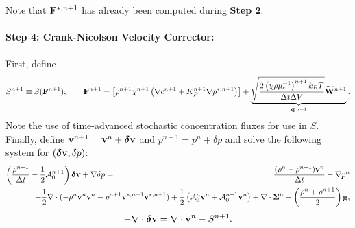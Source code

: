 \documentclass[final]{siamltex}
\def\Fb {{\bf F}}
\def\gb {{\bf g}}
\def\vb {{\bf v}}
\def\Wb {{\bf W}}
\def\deltab {\boldsymbol{\delta}}
\def\Psib   {\boldsymbol{\Psi}}
\def\Sigmab {\boldsymbol{\Sigma}}
\def\half   {\frac{1}{2}}
\begin{document}
Note that $\Fb^{*,n+1}$ has already been computed during {\bf Step 2}.\\ \\
{\bf Step 4: Crank-Nicolson Velocity Corrector:}\\ \\
First, define
\begin{equation}
S^{n+1} \equiv S(\Fb^{n+1});
\qquad
\Fb^{n+1} = \left[\rho^{n+1}\chi^{n+1}\left(\nabla c^{n+1} + K_P^{n+1}\nabla p^{*,n+1}\right)\right] + \underbrace{\sqrt{\frac{2\left(\chi\rho\mu_c^{-1}\right)^{n+1}k_B T}{\Delta t\Delta V}}\widetilde\Wb^{n+1}}_{\Psib^{n+1}}.
\end{equation}
Note the use of time-advanced stochastic concentration fluxes for use in $S$.  Finally, 
define $\vb^{n+1} = \vb^n + \deltab\vb$ and $p^{n+1} = p^n + \delta p$ and
solve the following system for $(\deltab\vb,\delta p)$:
\begin{eqnarray}
\left(\frac{\rho^{n+1}}{\Delta t} - \half\mathcal{A}_0^{n+1}\right)\deltab\vb + \nabla\delta p &=& \frac{(\rho^n-\rho^{n+1})\vb^n}{\Delta t} -\nabla p^n\nonumber\\
&&\hspace{-1.5in}+ \half\nabla\cdot(-\rho^n\vb^n\vb^n - \rho^{n+1}\vb^{*,n+1}\vb^{*,n+1}) + \half\left(\mathcal{A}^n_0\vb^n + \mathcal{A}^{n+1}_0\vb^n\right) + \nabla\cdot\Sigmab^n + \left(\frac{\rho^n+\rho^{n+1}}{2}\right)\gb,\nonumber\\
\end{eqnarray}
\begin{equation}
-\nabla\cdot\deltab\vb = \nabla\cdot\vb^n - S^{n+1}.
\end{equation}
\end{document}
